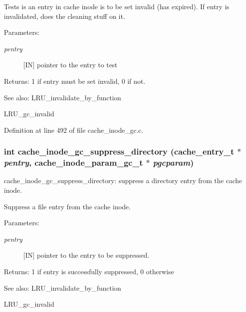 Tests is an entry in cache inode is to be set invalid (has expired). If entry is invalidated, does the cleaning stuff on it.

\begin{Desc}
\item[Parameters:]
\begin{description}
\item[{\em pentry}][IN] pointer to the entry to test\end{description}
\end{Desc}
\begin{Desc}
\item[Returns:]1 if entry must be set invalid, 0 if not.\end{Desc}
\begin{Desc}
\item[See also:]LRU\_\-invalidate\_\-by\_\-function 

LRU\_\-gc\_\-invalid \end{Desc}


Definition at line 492 of file cache\_\-inode\_\-gc.c.
\subsubsection[{cache\_\-inode\_\-gc\_\-suppress\_\-directory}]{\setlength{\rightskip}{0pt plus 5cm}int cache\_\-inode\_\-gc\_\-suppress\_\-directory (cache\_\-entry\_\-t $\ast$ {\em pentry}, \/  cache\_\-inode\_\-param\_\-gc\_\-t $\ast$ {\em pgcparam})}\label{group__Cache__inode__gc__internal_g24883ab5f9452a23cab665aabfc71873}


cache\_\-inode\_\-gc\_\-suppress\_\-directory: suppress a directory entry from the cache inode.

Suppress a file entry from the cache inode.

\begin{Desc}
\item[Parameters:]
\begin{description}
\item[{\em pentry}][IN] pointer to the entry to be suppressed.\end{description}
\end{Desc}
\begin{Desc}
\item[Returns:]1 if entry is successfully suppressed, 0 otherwise\end{Desc}
\begin{Desc}
\item[See also:]LRU\_\-invalidate\_\-by\_\-function 

LRU\_\-gc\_\-invalid \end{Desc}


